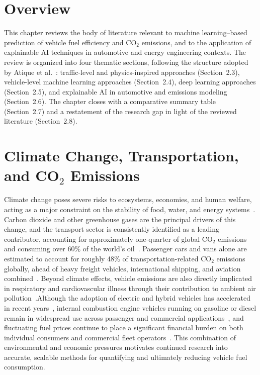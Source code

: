 \section{Overview}

This chapter reviews the body of literature relevant to machine learning--based prediction of vehicle fuel efficiency and CO$_2$ emissions, and to the application of explainable AI techniques in automotive and energy engineering contexts. The review is organized into four thematic sections, following the structure adopted by Atique et al.~\cite{atique2026explainable}: traffic-level and physics-inspired approaches (Section~2.3), vehicle-level machine learning approaches (Section~2.4), deep learning approaches (Section~2.5), and explainable AI in automotive and emissions modeling (Section~2.6). The chapter closes with a comparative summary table (Section~2.7) and a restatement of the research gap in light of the reviewed literature (Section~2.8).

\section{Climate Change, Transportation, and CO$_2$ Emissions}

Climate change poses severe risks to ecosystems, economies, and human welfare, acting as a major constraint on the stability of food, water, and energy systems~\cite{atique2026explainable}\cite{schleussner2016differential}. Carbon dioxide and other greenhouse gases are the principal drivers of this change, and the transport sector is consistently identified as a leading contributor, accounting for approximately one-quarter of global CO$_2$ emissions and consuming over 60\% of the world's oil~\cite{atique2026explainable}\cite{johnson2010review}\cite{florini2011international}. Passenger cars and vans alone are estimated to account for roughly 48\% of transportation-related CO$_2$ emissions globally, ahead of heavy freight vehicles, international shipping, and aviation combined~\cite{atique2026explainable}\cite{huh2023oh}. Beyond climate effects, vehicle emissions are also directly implicated in respiratory and cardiovascular illness through their contribution to ambient air pollution~\cite{atique2026explainable}\cite{eren2024predicting}\cite{world2026health}.Although the adoption of electric and hybrid vehicles has accelerated in recent years~\cite{coffman2017electric}, internal combustion engine vehicles running on gasoline or diesel remain in widespread use across passenger and commercial applications~\cite{park2023development}, and fluctuating fuel prices continue to place a significant financial burden on both individual consumers and commercial fleet operators~\cite{atique2026explainable}. This combination of environmental and economic pressures motivates continued research into accurate, scalable methods for quantifying and ultimately reducing vehicle fuel consumption.

